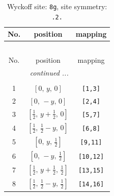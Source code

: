 \documentclass[fleqn,8pt]{jsarticle}
\begin{document}
\begin{longtable}{ccc}
\caption{Wyckoff site: {\tt 8g}, site symmetry: {\tt .2.}}
 \\
 \hline \hline
No. & position & mapping \\ \hline \endfirsthead

\multicolumn{2}{l}{\tablename\ \thetable{}} \\
 \hline \hline
No. & position & mapping \\ \hline \endhead

 \hline \hline
\multicolumn{2}{r}{\footnotesize\it continued ...} \\ \endfoot

 \hline \hline
\multicolumn{2}{r}{} \\ \endlastfoot

1 & $\left[ 0,\, y,\, 0 \right]$ & {\tt [1,3]} \\ \hline
2 & $\left[ 0,\, - y,\, 0 \right]$ & {\tt [2,4]} \\ \hline
3 & $\left[ \frac{1}{2},\, y + \frac{1}{2},\, 0 \right]$ & {\tt [5,7]} \\ \hline
4 & $\left[ \frac{1}{2},\, \frac{1}{2} - y,\, 0 \right]$ & {\tt [6,8]} \\ \hline
5 & $\left[ 0,\, y,\, \frac{1}{2} \right]$ & {\tt [9,11]} \\ \hline
6 & $\left[ 0,\, - y,\, \frac{1}{2} \right]$ & {\tt [10,12]} \\ \hline
7 & $\left[ \frac{1}{2},\, y + \frac{1}{2},\, \frac{1}{2} \right]$ & {\tt [13,15]} \\ \hline
8 & $\left[ \frac{1}{2},\, \frac{1}{2} - y,\, \frac{1}{2} \right]$ & {\tt [14,16]} \\
\end{longtable}
\renewcommand{\arraystretch}{1.2}
\end{document}
